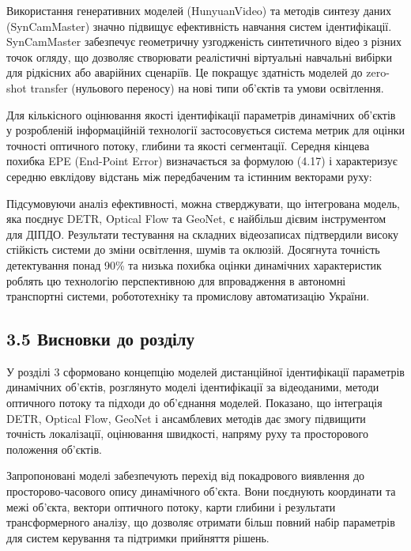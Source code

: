 \documentclass[
]{article}
\begin{document}
Використання генеративних моделей (HunyuanVideo) та методів синтезу даних (SynCamMaster) значно підвищує ефективність навчання систем ідентифікації. SynCamMaster забезпечує геометричну узгодженість синтетичного відео з різних точок огляду, що дозволяє створювати реалістичні віртуальні навчальні вибірки для рідкісних або аварійних сценаріїв. Це покращує здатність моделей до zero-shot transfer (нульового переносу) на нові типи об'єктів та умови освітлення.

Для кількісного оцінювання якості ідентифікації параметрів динамічних об'єктів у розробленій інформаційній технології застосовується система метрик для оцінки точності оптичного потоку, глибини та якості сегментації. Середня кінцева похибка EPE (End-Point Error) визначається за формулою (4.17) і характеризує середню евклідову відстань між передбаченим та істинним векторами руху:

Підсумовуючи аналіз ефективності, можна стверджувати, що інтегрована модель, яка поєднує DETR, Optical Flow та GeoNet, є найбільш дієвим інструментом для ДІПДО. Результати тестування на складних відеозаписах підтвердили високу стійкість системи до зміни освітлення, шумів та оклюзій. Досягнута точність детектування понад 90\% та низька похибка оцінки динамічних характеристик роблять цю технологію перспективною для впровадження в автономні транспортні системи, робототехніку та промислову автоматизацію України.

\subsection{3.5 Висновки до розділу}\label{ux432ux438ux441ux43dux43eux432ux43aux438-ux434ux43e-ux440ux43eux437ux434ux456ux43bux443-2}

У розділі 3 сформовано концепцію моделей дистанційної ідентифікації параметрів динамічних об'єктів, розглянуто моделі ідентифікації за відеоданими, методи оптичного потоку та підходи до об'єднання моделей. Показано, що інтеграція DETR, Optical Flow, GeoNet і ансамблевих методів дає змогу підвищити точність локалізації, оцінювання швидкості, напряму руху та просторового положення об'єктів.

Запропоновані моделі забезпечують перехід від покадрового виявлення до просторово-часового опису динамічного об'єкта. Вони поєднують координати та межі об'єкта, вектори оптичного потоку, карти глибини і результати трансформерного аналізу, що дозволяє отримати більш повний набір параметрів для систем керування та підтримки прийняття рішень.
\end{document}
